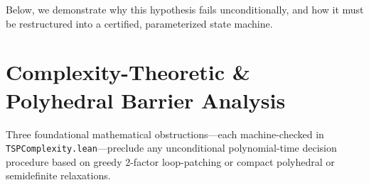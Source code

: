 \documentclass[11pt,a4paper]{article}
\renewcommand{\_}{\origunderscore\allowbreak}
\theoremstyle{plain}
\theoremstyle{definition}
\theoremstyle{remark}
\begin{document}
Below, we demonstrate why this hypothesis fails unconditionally, and how it must be restructured into a certified, parameterized state machine.

\section{Complexity-Theoretic \& Polyhedral Barrier Analysis}

Three foundational mathematical obstructions---each machine-checked in \texttt{TSP\allowbreak Complexity.\allowbreak lean}---preclude any unconditional polynomial-time decision procedure based on greedy 2-factor loop-patching or compact polyhedral or semidefinite relaxations.
\end{document}
